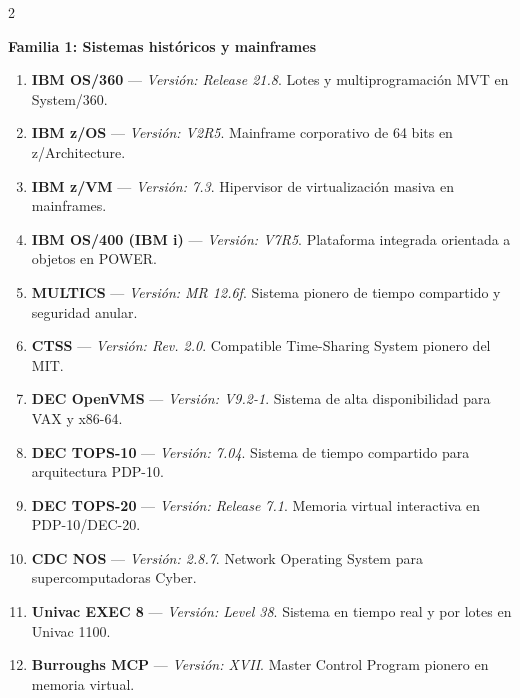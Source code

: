 \documentclass[12pt]{article}
\begin{document}
\begin{multicols}{2}
\small
\raggedright

\noindent\textbf{Familia 1: Sistemas históricos y mainframes}\par\smallskip
\begin{enumerate}[label=\textbf{\arabic*.}, leftmargin=*, noitemsep, topsep=1pt]
    \item \textbf{IBM OS/360} --- \textit{Versión: Release 21.8}. Lotes y multiprogramación MVT en System/360.
    \item \textbf{IBM z/OS} --- \textit{Versión: V2R5}. Mainframe corporativo de 64 bits en z/Architecture.
    \item \textbf{IBM z/VM} --- \textit{Versión: 7.3}. Hipervisor de virtualización masiva en mainframes.
    \item \textbf{IBM OS/400 (IBM i)} --- \textit{Versión: V7R5}. Plataforma integrada orientada a objetos en POWER.
    \item \textbf{MULTICS} --- \textit{Versión: MR 12.6f}. Sistema pionero de tiempo compartido y seguridad anular.
    \item \textbf{CTSS} --- \textit{Versión: Rev. 2.0}. Compatible Time-Sharing System pionero del MIT.
    \item \textbf{DEC OpenVMS} --- \textit{Versión: V9.2-1}. Sistema de alta disponibilidad para VAX y x86-64.
    \item \textbf{DEC TOPS-10} --- \textit{Versión: 7.04}. Sistema de tiempo compartido para arquitectura PDP-10.
    \item \textbf{DEC TOPS-20} --- \textit{Versión: Release 7.1}. Memoria virtual interactiva en PDP-10/DEC-20.
    \item \textbf{CDC NOS} --- \textit{Versión: 2.8.7}. Network Operating System para supercomputadoras Cyber.
    \item \textbf{Univac EXEC 8} --- \textit{Versión: Level 38}. Sistema en tiempo real y por lotes en Univac 1100.
    \item \textbf{Burroughs MCP} --- \textit{Versión: XVII}. Master Control Program pionero en memoria virtual.
\end{enumerate}


\end{multicols}
\end{document}
